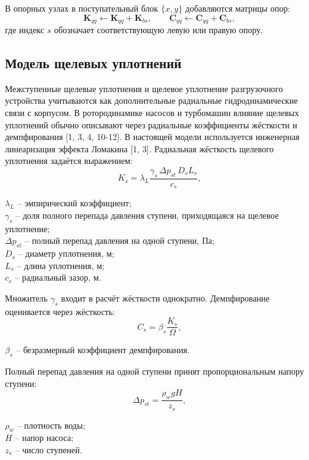 В опорных узлах в поступательный блок $\{x,y\}$ добавляются матрицы опор:
\begin{equation}
    \mathbf{K}_{qq}\leftarrow \mathbf{K}_{qq}+\mathbf{K}_{bs},\qquad
    \mathbf{C}_{qq}\leftarrow \mathbf{C}_{qq}+\mathbf{C}_{bs},
\end{equation}
где индекс $s$ обозначает соответствующую левую или правую опору.

\subsection{Модель щелевых уплотнений}

Межступенные щелевые уплотнения и щелевое уплотнение разгрузочного устройства учитываются как дополнительные радиальные гидродинамические связи с корпусом. В ротородинамике насосов и турбомашин влияние щелевых уплотнений обычно описывают через радиальные коэффициенты жёсткости и демпфирования [1, 3, 4, 10-12]. В настоящей модели используется инженерная линеаризация эффекта Ломакина [1, 3]. Радиальная жёсткость щелевого уплотнения задаётся выражением:
\begin{equation}
    K_s=\lambda_L\frac{\gamma_s\,\Delta p_{st}\,D_s L_s}{c_s},
    \label{eq:lomakin_stiffness}
\end{equation}
\begin{conditions}
$\lambda_L$ -- эмпирический коэффициент;\\
$\gamma_s$ -- доля полного перепада давления ступени, приходящаяся на щелевое уплотнение;\\
$\Delta p_{st}$ -- полный перепад давления на одной ступени, Па;\\
$D_s$ -- диаметр уплотнения, м;\\
$L_s$ -- длина уплотнения, м;\\
$c_s$ -- радиальный зазор, м.
\end{conditions}

Множитель $\gamma_s$ входит в расчёт жёсткости однократно. Демпфирование оценивается через жёсткость:
\begin{equation}
    C_s=\beta_s\frac{K_s}{\Omega},
    \label{eq:seal_damping}
\end{equation}
\begin{conditions}
$\beta_s$ -- безразмерный коэффициент демпфирования.
\end{conditions}

Полный перепад давления на одной ступени принят пропорциональным напору ступени:
\begin{equation}
    \Delta p_{st}=\frac{\rho_w gH}{z_s},
    \label{eq:stage_pressure_drop}
\end{equation}
\begin{conditions}
$\rho_w$ -- плотность воды;\\
$H$ -- напор насоса;\\
$z_s$ -- число ступеней.
\end{conditions}

